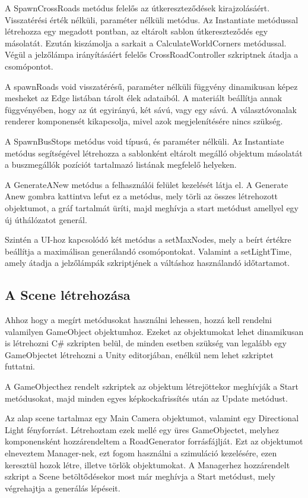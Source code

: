 A SpawnCrossRoads metódus felelős az útkereszteződések kirajzolásáért. Visszatérési érték nélküli, paraméter nélküli metódus. Az Instantiate metódussal létrehozza egy megadott pontban, az eltárolt sablon útkereszteződés egy másolatát. Ezután kiszámolja a sarkait a CalculateWorldCorners metódussal. Végül a jelzőlámpa irányításáért felelős CrossRoadController szkriptnek átadja a csomópontot.

A spawnRoads void visszatérésű, paraméter nélküli függvény dinamikusan képez mesheket az Edge listában tárolt élek adataiból. A materiált beállítja annak függvényében, hogy az út egyirányú, két sávú, vagy egy sávú. A választóvonalak renderer komponensét kikapcsolja, mivel azok megjelenítésére nincs szükség. 

A SpawnBusStops metódus void típusú, és paraméter nélküli. Az Instantiate metódus segítségével létrehozza a sablonként eltárolt megálló objektum másolatát a buszmegállók pozíciót tartalmazó listának megfelelő helyeken.

A GenerateANew metódus a felhasználói felület kezelését látja el. A Generate Anew gombra kattintva lefut ez a metódus, mely törli az összes létrehozott objektumot, a gráf tartalmát üríti, majd meghívja a start metódust amellyel egy új úthálózatot generál.

Szintén a UI-hoz kapcsolódó két metódus a setMaxNodes, mely a beírt értékre beállítja a maximálisan generálandó csomópontokat. Valamint a setLightTime, amely átadja a jelzőlámpák szkriptjének a váltáshoz használandó időtartamot.
\subsection{A Scene létrehozása}
Ahhoz hogy a megírt metódusokat használni lehessen, hozzá kell rendelni valamilyen GameObject objektumhoz. Ezeket az objektumokat lehet dinamikusan is létrehozni C\# szkripten belül, de minden esetben szükség van legalább egy GameObjectet létrehozni a Unity editorjában, enélkül nem lehet szkriptet futtatni.

A GameObjecthez rendelt szkriptek az objektum létrejöttekor meghívják a Start metódusokat, majd minden egyes képkockafrissítés után az Update metódust.

Az alap scene tartalmaz egy Main Camera objektumot, valamint egy Directional Light fényforrást. Létrehoztam ezek mellé egy üres GameObjectet, melyhez komponensként hozzárendeltem a RoadGenerator forrásfájlját. Ezt az objektumot elneveztem Manager-nek, ezt fogom használni a szimuláció kezelésére, ezen keresztül hozok létre, illetve törlök objektumokat. A Managerhez hozzárendelt szkript a Scene betöltődésekor most már meghívja a Start metódust, mely végrehajtja a generálás lépéseit.

